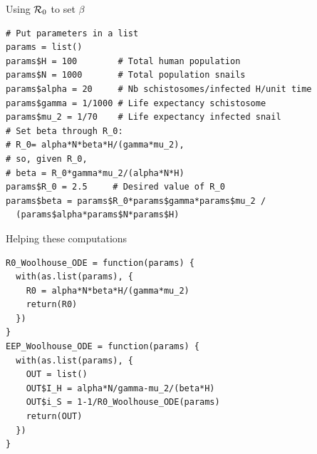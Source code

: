 \documentclass[aspectratio=169]{beamer}
\begin{document}
\begin{frame}[fragile]{Using $\mathcal{R}_0$ to set $\beta$}
\begin{lstlisting}
# Put parameters in a list
params = list()
params$H = 100        # Total human population
params$N = 1000       # Total population snails
params$alpha = 20     # Nb schistosomes/infected H/unit time
params$gamma = 1/1000 # Life expectancy schistosome
params$mu_2 = 1/70    # Life expectancy infected snail
# Set beta through R_0:
# R_0= alpha*N*beta*H/(gamma*mu_2),
# so, given R_0, 
# beta = R_0*gamma*mu_2/(alpha*N*H)
params$R_0 = 2.5     # Desired value of R_0
params$beta = params$R_0*params$gamma*params$mu_2 / 
  (params$alpha*params$N*params$H)
\end{lstlisting}
\end{frame}
    
    
  
\begin{frame}[fragile]{Helping these computations}
\begin{lstlisting}
R0_Woolhouse_ODE = function(params) {
  with(as.list(params), {
    R0 = alpha*N*beta*H/(gamma*mu_2)
    return(R0)
  })
}
EEP_Woolhouse_ODE = function(params) {
  with(as.list(params), {
    OUT = list()
    OUT$I_H = alpha*N/gamma-mu_2/(beta*H)
    OUT$i_S = 1-1/R0_Woolhouse_ODE(params)
    return(OUT)
  })
}  
\end{lstlisting}
\end{frame}

\end{document}
